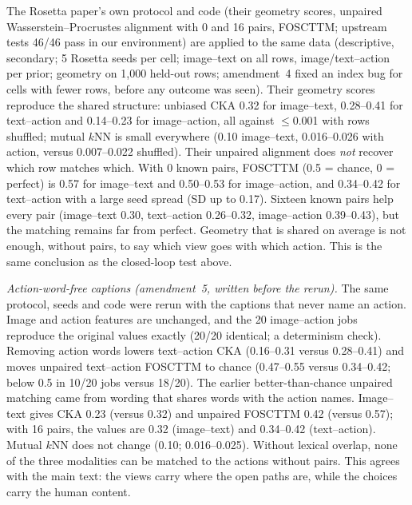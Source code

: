 \documentclass[10pt,onecolumn,letterpaper]{article}
\begin{document}
The Rosetta paper's own protocol and code (their geometry scores, unpaired
Wasserstein--Procrustes alignment with 0 and 16 pairs, FOSCTTM; upstream tests 46/46 pass in our environment) are
applied to the same data (descriptive, secondary; 5 Rosetta seeds per cell; image--text on all rows, image/text--action
per prior; geometry on 1{,}000 held-out rows; amendment~4 fixed an index bug for cells with fewer rows, before any
outcome was seen). Their geometry scores reproduce the shared structure: unbiased CKA 0.32 for image--text, 0.28--0.41
for text--action and 0.14--0.23 for image--action, all against $\le$0.001 with rows shuffled; mutual $k$NN is small
everywhere (0.10 image--text, 0.016--0.026 with action, versus 0.007--0.022 shuffled). Their unpaired alignment does
\emph{not} recover which row matches which. With 0 known pairs, FOSCTTM (0.5 = chance, 0 = perfect) is 0.57 for
image--text and 0.50--0.53 for image--action, and 0.34--0.42 for text--action with a large seed spread (SD up to 0.17).
Sixteen known pairs help every pair (image--text 0.30, text--action 0.26--0.32, image--action 0.39--0.43), but the matching
remains far from perfect. Geometry that is shared on average is not enough, without pairs, to say which view goes with
which action. This is the same conclusion as the closed-loop test above.

\emph{Action-word-free captions (amendment~5, written before the rerun).} The same protocol, seeds and code were rerun
with the captions that never name an action. Image and action features are unchanged, and the 20 image--action jobs
reproduce the original values exactly (20/20 identical; a determinism check). Removing action words lowers text--action
CKA (0.16--0.31 versus 0.28--0.41) and moves unpaired text--action FOSCTTM to chance (0.47--0.55 versus 0.34--0.42;
below 0.5 in 10/20 jobs versus 18/20). The earlier better-than-chance unpaired matching came from wording that shares
words with the action names. Image--text gives CKA 0.23 (versus 0.32) and unpaired FOSCTTM 0.42 (versus 0.57); with 16
pairs, the values are 0.32 (image--text) and 0.34--0.42 (text--action). Mutual $k$NN does not change (0.10; 0.016--0.025).
Without lexical overlap, none of the three modalities can be matched to the actions without pairs. This agrees with the
main text: the views carry where the open paths are, while the choices carry the human content.
\end{document}
